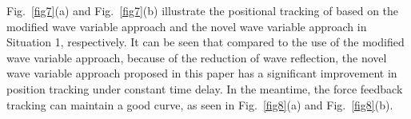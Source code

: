 \par  Fig.~\ref{fig7}(a) and Fig.~\ref{fig7}(b)  illustrate the positional tracking of based on the
modified wave variable approach and the novel wave variable approach in Situation 1, respectively.
It can be seen that compared to the use of the modified wave variable approach, 
because of the reduction of wave reflection,
the novel wave variable approach proposed in this paper
has a significant improvement in position tracking under constant time delay.
In the meantime,
the force feedback tracking can maintain a good curve,
as seen in Fig.~\ref{fig8}(a) and Fig.~\ref{fig8}(b). 
